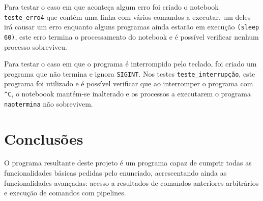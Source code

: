 \documentclass[a4paper]{article}
\begin{document}
Para testar o caso em que aconteça algum erro foi criado o notebook \texttt{teste\_erro4} que contém uma linha com vários comandos a executar, um deles irá causar um erro enquanto alguns programas ainda  estarão em execução \texttt{(sleep 60)}, este erro termina o processamento do notebook e é possível verificar nenhum processo sobreviveu.

Para testar o caso em que o programa é interrompido pelo teclado, foi criado um programa que não termina e ignora \texttt{SIGINT}. Nos testes \texttt{teste\_interrupção}, este programa foi utilizado e é possível verificar que ao interromper o programa com \texttt{\^{}C}, o noteboook mantém-se inalterado e os processos a executarem o programa \texttt{naotermina} não sobrevivem.

\section{Conclusões}
\label{sec:conclusao}

O programa resultante deste projeto é um programa capaz de cumprir
todas as funcionalidades básicas pedidas pelo enunciado, acrescentando ainda
as funcionalidades avançadas: acesso a resultados de comandos anteriores arbitrários
e execução de comandos com pipelines.
\end{document}
